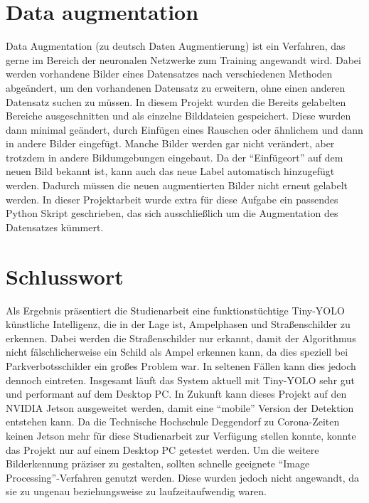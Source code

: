 \documentclass[a4paper,oneside,12pt]{report}
\begin{document}
	\chapter{Data augmentation}
	\begin{onehalfspace}
		Data Augmentation (zu deutsch Daten Augmentierung) ist ein Verfahren, das gerne im Bereich der neuronalen Netzwerke zum Training angewandt wird. Dabei werden vorhandene Bilder eines Datensatzes nach verschiedenen Methoden abgeändert, um den vorhandenen Datensatz zu erweitern, ohne einen anderen Datensatz suchen zu müssen. In diesem Projekt wurden die Bereits gelabelten Bereiche ausgeschnitten und als einzelne Bilddateien gespeichert. Diese wurden dann minimal geändert, durch Einfügen eines Rauschen oder ähnlichem und dann in andere Bilder eingefügt. Manche Bilder werden gar nicht verändert, aber trotzdem in andere Bildumgebungen eingebaut. Da der "`Einfügeort"' auf dem neuen Bild bekannt ist, kann auch das neue Label automatisch hinzugefügt werden. Dadurch müssen die neuen augmentierten Bilder nicht erneut gelabelt werden. In dieser Projektarbeit wurde extra für diese Aufgabe ein passendes Python Skript geschrieben, das sich ausschließlich um die Augmentation des Datensatzes kümmert.
	\end{onehalfspace}
	\chapter{Schlusswort}
	\begin{onehalfspace}
		Als Ergebnis präsentiert die Studienarbeit eine funktionstüchtige Tiny-YOLO künstliche Intelligenz, die in der Lage ist, Ampelphasen und Straßenschilder zu erkennen. Dabei werden die Straßenschilder nur erkannt, damit der Algorithmus nicht fälschlicherweise ein Schild als Ampel erkennen kann, da dies speziell bei Parkverbotsschilder ein großes Problem war. In seltenen Fällen kann dies jedoch dennoch eintreten. Insgesamt läuft das System aktuell mit Tiny-YOLO sehr gut und performant auf dem Desktop PC. In Zukunft kann dieses Projekt auf den NVIDIA Jetson ausgeweitet werden, damit eine "`mobile"' Version der Detektion entstehen kann. Da die Technische Hochschule Deggendorf zu Corona-Zeiten keinen Jetson mehr für diese Studienarbeit zur Verfügung stellen konnte, konnte das Projekt nur auf einem Desktop PC getestet werden. Um die weitere Bilderkennung präziser zu gestalten, sollten schnelle geeignete "`Image Processing"'-Verfahren genutzt werden. Diese wurden jedoch nicht angewandt, da sie zu ungenau beziehungsweise zu laufzeitaufwendig waren.
	\end{onehalfspace}
	
\end{document}
